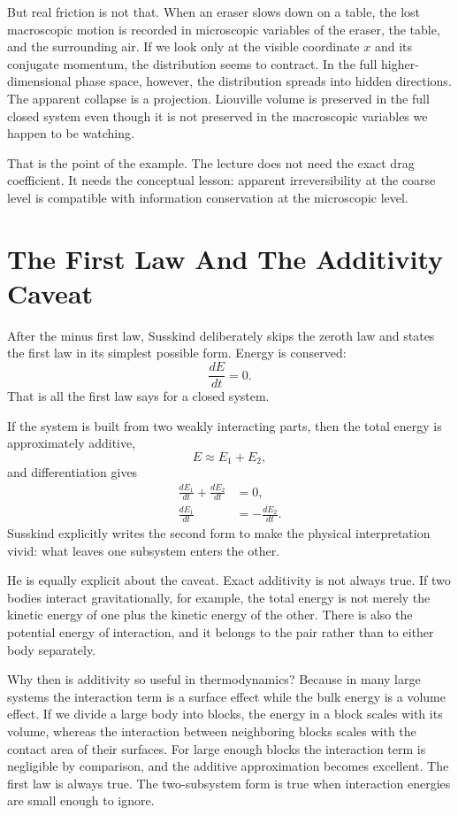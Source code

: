 But real friction is not that. When an eraser slows down on a table, the lost macroscopic motion is recorded in microscopic variables of the eraser, the table, and the surrounding air. If we look only at the visible coordinate \(x\) and its conjugate momentum, the distribution seems to contract. In the full higher-dimensional phase space, however, the distribution spreads into hidden directions. The apparent collapse is a projection. Liouville volume is preserved in the full closed system even though it is not preserved in the macroscopic variables we happen to be watching.

That is the point of the example. The lecture does not need the exact drag coefficient. It needs the conceptual lesson: apparent irreversibility at the coarse level is compatible with information conservation at the microscopic level.

\section{The First Law And The Additivity Caveat}

After the minus first law, Susskind deliberately skips the zeroth law and states the first law in its simplest possible form. Energy is conserved:
\begin{equation}
\frac{dE}{dt}=0.
\end{equation}
That is all the first law says for a closed system.

If the system is built from two weakly interacting parts, then the total energy is approximately additive,
\begin{equation}
E \approx E_1+E_2,
\end{equation}
and differentiation gives
\begin{align}
\frac{dE_1}{dt}+\frac{dE_2}{dt} &= 0, \\
\frac{dE_1}{dt} &= -\frac{dE_2}{dt}.
\end{align}
Susskind explicitly writes the second form to make the physical interpretation vivid: what leaves one subsystem enters the other.

He is equally explicit about the caveat. Exact additivity is not always true. If two bodies interact gravitationally, for example, the total energy is not merely the kinetic energy of one plus the kinetic energy of the other. There is also the potential energy of interaction, and it belongs to the pair rather than to either body separately.

Why then is additivity so useful in thermodynamics? Because in many large systems the interaction term is a surface effect while the bulk energy is a volume effect. If we divide a large body into blocks, the energy in a block scales with its volume, whereas the interaction between neighboring blocks scales with the contact area of their surfaces. For large enough blocks the interaction term is negligible by comparison, and the additive approximation becomes excellent. The first law is always true. The two-subsystem form is true when interaction energies are small enough to ignore.

